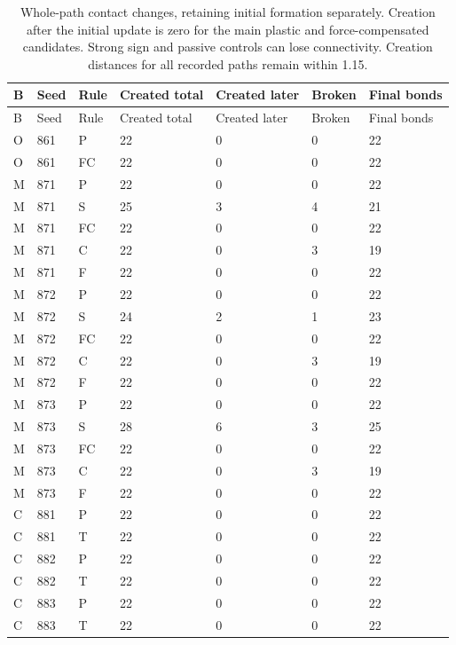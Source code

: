 \begin{longtable}{lllllll}
\caption{Whole-path contact changes, retaining initial formation separately. Creation after the initial update is zero for the main plastic and force-compensated candidates. Strong sign and passive controls can lose connectivity. Creation distances for all recorded paths remain within 1.15.}\label{tab:contact-contacts}\\
\toprule
B & Seed & Rule & Created total & Created later & Broken & Final bonds\\
\midrule\endfirsthead
\toprule
B & Seed & Rule & Created total & Created later & Broken & Final bonds\\
\midrule\endhead
O & 861 & P & 22 & 0 & 0 & 22\\
O & 861 & FC & 22 & 0 & 0 & 22\\
M & 871 & P & 22 & 0 & 0 & 22\\
M & 871 & S & 25 & 3 & 4 & 21\\
M & 871 & FC & 22 & 0 & 0 & 22\\
M & 871 & C & 22 & 0 & 3 & 19\\
M & 871 & F & 22 & 0 & 0 & 22\\
M & 872 & P & 22 & 0 & 0 & 22\\
M & 872 & S & 24 & 2 & 1 & 23\\
M & 872 & FC & 22 & 0 & 0 & 22\\
M & 872 & C & 22 & 0 & 3 & 19\\
M & 872 & F & 22 & 0 & 0 & 22\\
M & 873 & P & 22 & 0 & 0 & 22\\
M & 873 & S & 28 & 6 & 3 & 25\\
M & 873 & FC & 22 & 0 & 0 & 22\\
M & 873 & C & 22 & 0 & 3 & 19\\
M & 873 & F & 22 & 0 & 0 & 22\\
C & 881 & P & 22 & 0 & 0 & 22\\
C & 881 & T & 22 & 0 & 0 & 22\\
C & 882 & P & 22 & 0 & 0 & 22\\
C & 882 & T & 22 & 0 & 0 & 22\\
C & 883 & P & 22 & 0 & 0 & 22\\
C & 883 & T & 22 & 0 & 0 & 22\\
\bottomrule
\end{longtable}
